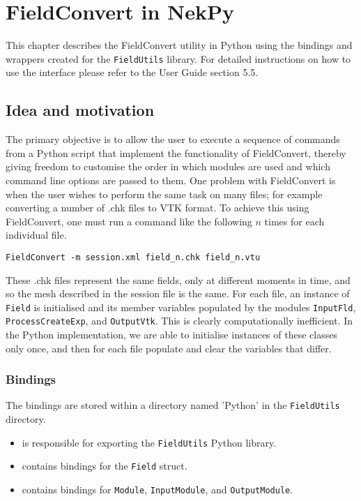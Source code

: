 \chapter{FieldConvert in NekPy}

This chapter describes the FieldConvert utility in Python using the bindings
and wrappers created for the \verb+FieldUtils+ library. For detailed
instructions on how to use the interface please refer to the
{\nek} User Guide section 5.5.

\section{Idea and motivation}

The primary objective is to allow the user to execute a sequence of
commands from a Python script that implement the functionality of
FieldConvert, thereby giving freedom to customise the order in which
modules are used and which command line options are passed to them.
One problem with FieldConvert is when the user wishes to perform the same
task on many files; for example converting a number of .chk files to VTK
format. To achieve this using FieldConvert, one must run a command like
the following $n$ times for each individual file.

\begin{lstlisting}[style=BashInputStyle]
FieldConvert -m session.xml field_n.chk field_n.vtu
\end{lstlisting}

These .chk files represent the same fields, only at different moments in
time, and so the mesh described in the session file is the same. For each
file, an instance of \verb+Field+ is initialised and its member variables
populated by the modules \verb+InputFld+, \verb+ProcessCreateExp+, and
\verb+OutputVtk+. This is clearly computationally inefficient. In the Python
implementation, we are able to initialise instances of these classes only
once, and then for each file populate and clear the variables that differ.


\subsection{Bindings}

The bindings are stored within a directory named 'Python' in the
\texttt{FieldUtils} directory.

\begin{itemize}
    \item {} is responsible for
		  exporting the \verb+FieldUtils+ Python library.
    \item {} contains bindings for the \verb+Field+ struct.
    \item {} contains bindings for \verb+Module+,
	      \verb+InputModule+, and \verb+OutputModule+.
\end{itemize}
